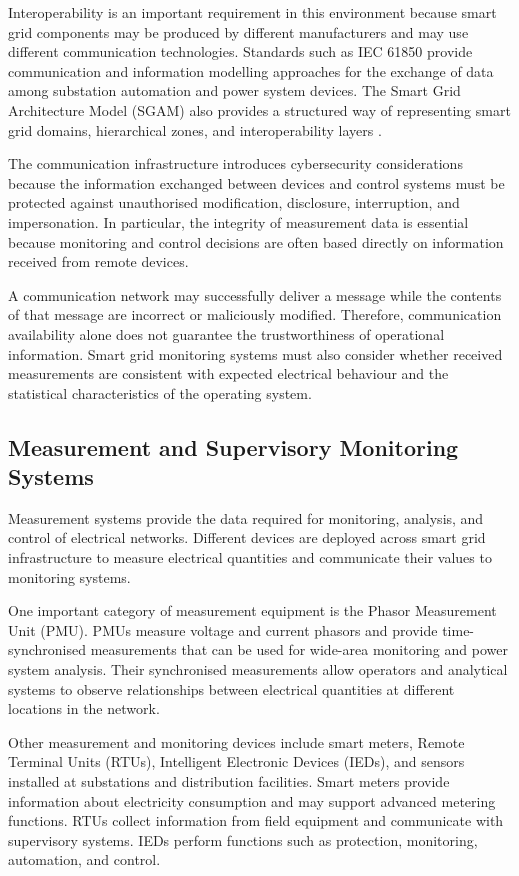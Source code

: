 \documentclass[12pt,a4paper]{report}
\begin{document}
Interoperability is an important requirement in this environment because smart grid components
may be produced by different manufacturers and may use different communication technologies.
Standards such as IEC 61850 provide communication and information modelling approaches for the
exchange of data among substation automation and power system devices. The Smart Grid Architecture
Model (SGAM) also provides a structured way of representing smart grid domains, hierarchical
zones, and interoperability layers \cite{iec61850_sgam}.

The communication infrastructure introduces cybersecurity considerations because the information
exchanged between devices and control systems must be protected against unauthorised modification,
disclosure, interruption, and impersonation. In particular, the integrity of measurement data is
essential because monitoring and control decisions are often based directly on information
received from remote devices.

A communication network may successfully deliver a message while the contents of that message
are incorrect or maliciously modified. Therefore, communication availability alone does not
guarantee the trustworthiness of operational information. Smart grid monitoring systems must
also consider whether received measurements are consistent with expected electrical behaviour
and the statistical characteristics of the operating system.

\subsection{Measurement and Supervisory Monitoring Systems}
Measurement systems provide the data required for monitoring, analysis, and control of
electrical networks. Different devices are deployed across smart grid infrastructure to measure
electrical quantities and communicate their values to monitoring systems.

One important category of measurement equipment is the Phasor Measurement Unit (PMU). PMUs
measure voltage and current phasors and provide time-synchronised measurements that can be used
for wide-area monitoring and power system analysis. Their synchronised measurements allow
operators and analytical systems to observe relationships between electrical quantities at
different locations in the network.

Other measurement and monitoring devices include smart meters, Remote Terminal Units (RTUs),
Intelligent Electronic Devices (IEDs), and sensors installed at substations and distribution
facilities. Smart meters provide information about electricity consumption and may support
advanced metering functions. RTUs collect information from field equipment and communicate with
supervisory systems. IEDs perform functions such as protection, monitoring, automation, and control.
\end{document}
